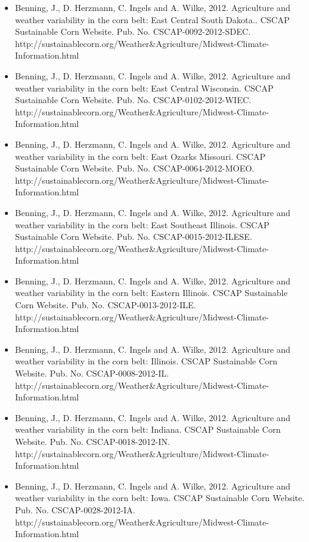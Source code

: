 \begin{itemize}
\item Benning, J., D. Herzmann, C. Ingels and A. Wilke, 2012. Agriculture and weather variability in the corn belt: East Central South Dakota.. CSCAP Sustainable Corn Website. Pub. No. CSCAP-0092-2012-SDEC. http://sustainablecorn.org/Weather\&Agriculture/Midwest-Climate-Information.html

\item Benning, J., D. Herzmann, C. Ingels and A. Wilke, 2012. Agriculture and weather variability in the corn belt: East Central Wisconsin. CSCAP Sustainable Corn Website. Pub. No. CSCAP-0102-2012-WIEC. http://sustainablecorn.org/Weather\&Agriculture/Midwest-Climate-Information.html

\item Benning, J., D. Herzmann, C. Ingels and A. Wilke, 2012. Agriculture and weather variability in the corn belt: East Ozarks Missouri. CSCAP Sustainable Corn Website. Pub. No. CSCAP-0064-2012-MOEO. http://sustainablecorn.org/Weather\&Agriculture/Midwest-Climate-Information.html

\item Benning, J., D. Herzmann, C. Ingels and A. Wilke, 2012. Agriculture and weather variability in the corn belt: East Southeast Illinois. CSCAP Sustainable Corn Website. Pub. No. CSCAP-0015-2012-ILESE. http://sustainablecorn.org/Weather\&Agriculture/Midwest-Climate-Information.html

\item Benning, J., D. Herzmann, C. Ingels and A. Wilke, 2012. Agriculture and weather variability in the corn belt: Eastern Illinois. CSCAP Sustainable Corn Website. Pub. No. CSCAP-0013-2012-ILE. http://sustainablecorn.org/Weather\&Agriculture/Midwest-Climate-Information.html

\item Benning, J., D. Herzmann, C. Ingels and A. Wilke, 2012. Agriculture and weather variability in the corn belt: Illinois. CSCAP Sustainable Corn Website. Pub. No. CSCAP-0008-2012-IL. http://sustainablecorn.org/Weather\&Agriculture/Midwest-Climate-Information.html

\item Benning, J., D. Herzmann, C. Ingels and A. Wilke, 2012. Agriculture and weather variability in the corn belt: Indiana. CSCAP Sustainable Corn Website. Pub. No. CSCAP-0018-2012-IN. http://sustainablecorn.org/Weather\&Agriculture/Midwest-Climate-Information.html

\item Benning, J., D. Herzmann, C. Ingels and A. Wilke, 2012. Agriculture and weather variability in the corn belt: Iowa. CSCAP Sustainable Corn Website. Pub. No. CSCAP-0028-2012-IA. http://sustainablecorn.org/Weather\&Agriculture/Midwest-Climate-Information.html


\end{itemize}
